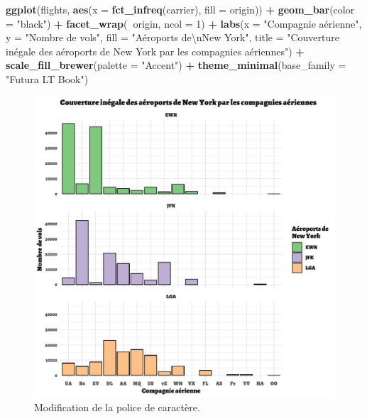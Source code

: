\documentclass[a4paperpaper,]{article}
\newenvironment{Shaded}{\begin{snugshade}}{\end{snugshade}}
\newcommand{\KeywordTok}[1]{\textcolor[rgb]{0.13,0.29,0.53}{\textbf{#1}}}
\newcommand{\DataTypeTok}[1]{\textcolor[rgb]{0.13,0.29,0.53}{#1}}
\newcommand{\DecValTok}[1]{\textcolor[rgb]{0.00,0.00,0.81}{#1}}
\newcommand{\CharTok}[1]{\textcolor[rgb]{0.31,0.60,0.02}{#1}}
\newcommand{\StringTok}[1]{\textcolor[rgb]{0.31,0.60,0.02}{#1}}
\newcommand{\OperatorTok}[1]{\textcolor[rgb]{0.81,0.36,0.00}{\textbf{#1}}}
\newcommand{\NormalTok}[1]{#1}
\theoremstyle{definition}
\theoremstyle{definition}
\theoremstyle{definition}
\theoremstyle{remark}
\begin{document}
\begin{Shaded}
\begin{Highlighting}[]
\KeywordTok{ggplot}\NormalTok{(flights, }\KeywordTok{aes}\NormalTok{(}\DataTypeTok{x =} \KeywordTok{fct_infreq}\NormalTok{(carrier), }\DataTypeTok{fill =}\NormalTok{ origin)) }\OperatorTok{+}
\StringTok{  }\KeywordTok{geom_bar}\NormalTok{(}\DataTypeTok{color =} \StringTok{"black"}\NormalTok{) }\OperatorTok{+}
\StringTok{  }\KeywordTok{facet_wrap}\NormalTok{(}\OperatorTok{~}\NormalTok{origin, }\DataTypeTok{ncol =} \DecValTok{1}\NormalTok{) }\OperatorTok{+}
\StringTok{  }\KeywordTok{labs}\NormalTok{(}\DataTypeTok{x =} \StringTok{"Compagnie aérienne"}\NormalTok{,}
       \DataTypeTok{y =} \StringTok{"Nombre de vols"}\NormalTok{,}
       \DataTypeTok{fill =} \StringTok{"Aéroports de}\CharTok{\textbackslash{}n}\StringTok{New York"}\NormalTok{,}
       \DataTypeTok{title =} \StringTok{"Couverture inégale des aéroports de New York par les compagnies aériennes"}\NormalTok{) }\OperatorTok{+}
\StringTok{  }\KeywordTok{scale_fill_brewer}\NormalTok{(}\DataTypeTok{palette =} \StringTok{"Accent"}\NormalTok{) }\OperatorTok{+}
\StringTok{  }\KeywordTok{theme_minimal}\NormalTok{(}\DataTypeTok{base_family =} \StringTok{"Futura LT Book"}\NormalTok{)}
\end{Highlighting}
\end{Shaded}

\begin{figure}[htpb]

{\centering \includegraphics[width=0.9\linewidth]{figure/themefont-1} 

}

\caption{Modification de la police de caractère.}\label{fig:themefont}
\end{figure}
\end{document}
